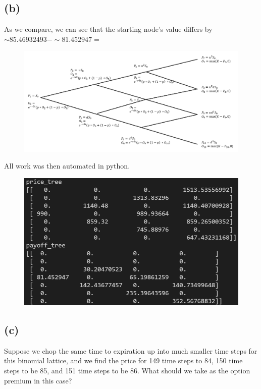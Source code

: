 \documentclass{article}
\begin{document}
{\newpage

\subsection*{(b)}

As we compare, we can see that the starting node's value differs by $\sim 85.46932493 - \sim 81.452947 = $ 

\begin{figure}[h]
  \centering
  \includegraphics[width=120mm]{./2b_tree.png}
\end{figure}

All work was then automated in python.

\begin{figure}[h]
  \centering
  \includegraphics[width=120mm]{./2b.png}
\end{figure}

\newpage

\subsection*{(c)}

Suppose we chop the same time to expiration up into much smaller time steps for this binomial lattice, and we find the price for 149 time steps to 84, 150 time steps to be 85, and 151 time steps to be 86. What should we take as the option premium in this case?



\newpage
}
\end{document}
